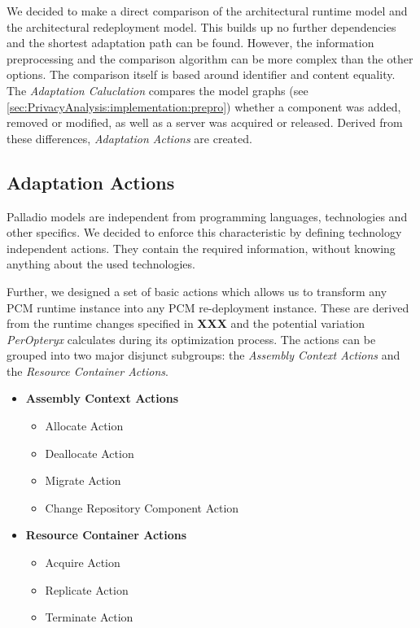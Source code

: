 We decided to make a direct comparison of the architectural runtime model and the architectural redeployment model. This builds up no further dependencies and the shortest adaptation path can be found. However, the information preprocessing and the comparison algorithm can be more complex than the other options. The comparison itself is based around identifier and content equality. The \textit{Adaptation Caluclation} compares the model graphs (see \autoref{sec:PrivacyAnalysis:implementation:prepro}) whether a component was added, removed or modified, as well as a server was acquired or released. Derived from these differences, \textit{Adaptation Actions} are created.


\subsection{Adaptation Actions}
Palladio models are independent from programming languages, technologies and other specifics. We decided to enforce this characteristic by defining technology independent actions. They contain the required information, without knowing anything about the used technologies.


Further, we designed a set of basic actions which allows us to transform any PCM runtime instance into any PCM re-deployment instance. These are derived from the runtime changes specified in \textbf{XXX} and the potential variation \textit{PerOpteryx} calculates during its optimization process. The actions can be grouped into two major disjunct subgroups: the \textit{Assembly Context Actions} and the \textit{Resource Container Actions}.

\begin{itemize}
	\label{enum:SysAdap:plan:actions}
	\setlength\itemsep{0em}
	\item \textbf{Assembly Context Actions}
	\begin{itemize}
		\setlength\itemsep{0em}
		\item Allocate Action
		\item Deallocate Action
		\item Migrate Action
		\item Change Repository Component Action
	\end{itemize}
	\item \textbf{Resource Container Actions}
	\begin{itemize}
		\setlength\itemsep{0em}
		\item Acquire Action
		\item Replicate Action
		\item Terminate Action
	\end{itemize}
\end{itemize}


